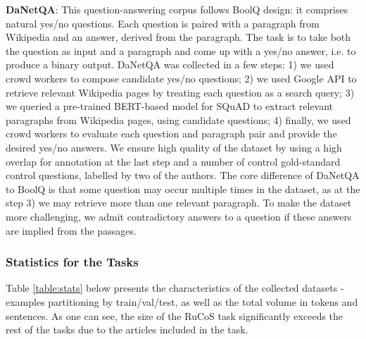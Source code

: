 \documentclass[11pt,a4paper]{article}
\begin{document}
{\bf DaNetQA}: This question-answering corpus follows BoolQ \cite{clark2019boolq} design: it comprises natural yes/no questions. Each question is paired with a paragraph from Wikipedia and an answer, derived from the paragraph. The task is  to take both the question as input and a paragraph and come up with a yes/no answer, i.e. to produce a binary output. DaNetQA was collected in a few steps: 1) we used crowd workers to compose candidate yes/no questions; 2) we used Google API to retrieve relevant Wikipedia pages by treating each question as a search query; 3) we queried a pre-trained BERT-based model for SQuAD \cite{kuratov2019adaptation} to extract relevant paragraphs from Wikipedia pages, using candidate questions; 4) finally, we used crowd workers to evaluate each question and paragraph pair and provide the desired yes/no answers. We ensure high quality of the dataset by using a high overlap for annotation at the last step and a number of control gold-standard control questions, labelled by two of the authors. The core difference of DaNetQA to BoolQ is that some question may occur multiple times in the dataset, as at the step 3) we may retrieve more than one relevant paragraph. To make the dataset more challenging, we admit contradictory answers to a question if these answers are implied from the passages.  





















\subsubsection{Statistics for the Tasks}
Table \ref{table:stats} below presents the characteristics of the collected datasets - examples partitioning by train/val/test, as well as the total volume in tokens and sentences. As one can see, the size of the RuCoS task significantly exceeds the rest of the tasks due to the articles included in the task. 
\end{document}
